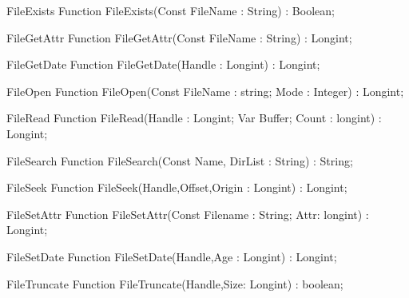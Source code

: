  
\begin{function}{FileExists}
\Declaration
Function FileExists(Const FileName : String) : Boolean;
\Description
\Errors
\SeeAlso
\end{function}

 
\begin{function}{FileGetAttr}
\Declaration
Function FileGetAttr(Const FileName : String) : Longint;
\Description
\Errors
\SeeAlso
\end{function}

 
\begin{function}{FileGetDate}
\Declaration
Function FileGetDate(Handle : Longint) : Longint;
\Description
\Errors
\SeeAlso
\end{function}

 
\begin{function}{FileOpen}
\Declaration
Function FileOpen(Const FileName : string; Mode : Integer) : Longint;
\Description
\Errors
\SeeAlso
\end{function}

 
\begin{function}{FileRead}
\Declaration
Function FileRead(Handle : Longint; Var Buffer; Count : longint) : Longint;
\Description
\Errors
\SeeAlso
\end{function}

 
\begin{function}{FileSearch}
\Declaration
Function FileSearch(Const Name, DirList : String) : String;
\Description
\Errors
\SeeAlso
\end{function}

 
\begin{function}{FileSeek}
\Declaration
Function FileSeek(Handle,Offset,Origin : Longint) : Longint;
\Description
\Errors
\SeeAlso
\end{function}

 
\begin{function}{FileSetAttr}
\Declaration
Function FileSetAttr(Const Filename : String; Attr: longint) : Longint;
\Description
\Errors
\SeeAlso
\end{function}

 
\begin{function}{FileSetDate}
\Declaration
Function FileSetDate(Handle,Age : Longint) : Longint;
\Description
\Errors
\SeeAlso
\end{function}

 
\begin{function}{FileTruncate}
\Declaration
Function FileTruncate(Handle,Size: Longint) : boolean;
\Description
\Errors
\SeeAlso
\end{function}

